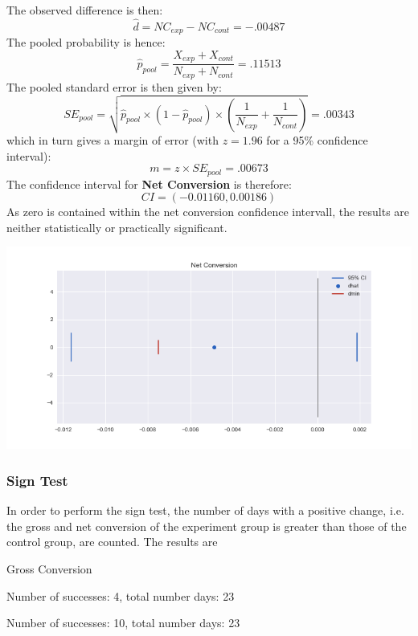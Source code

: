 \documentclass[11pt]{article} %
\begin{document}
The observed difference is then:
\begin{equation}
	\hat{d} = NC_{exp} - NC_{cont} = -.00487
\end{equation}
The pooled probability is hence:
\begin{equation}
	\hat{p}_{pool} = \frac{X_{exp}+ X_{cont}}{N_{exp} + N_{cont}} = .11513
\end{equation}
The pooled standard error is then given by:
\begin{equation}
	SE_{pool} = \sqrt{\hat{p}_{pool}\times \left(1-\hat{p}_{pool}\right) \times \left(\frac{1}{N_{exp}} + \frac{1}{N_{cont}}\right)} = .00343
\end{equation}
which in turn gives a margin of error (with $z=1.96$ for a 95\% confidence interval):
\begin{equation}
	m = z \times SE_{pool} = .00673
\end{equation}
The confidence interval for \textbf{Net Conversion} is therefore:
\begin{equation}
	CI = \left(-0.01160, 0.00186\right)
\end{equation}
As zero is contained within the net conversion confidence intervall, the results are neither statistically or practically significant.

\includegraphics[width=\textwidth]{net_conv}

\subsubsection{Sign Test}

In order to perform the sign test, the number of days with a positive change, i.e. the gross and net conversion of the experiment group is greater than those of the control group, are counted. The results are
\begin{labeling}{Gross Conversion}
\item[Gross Conversion] Number of successes: 4, total number days: 23
\item[Net Conversion] Number of successes: 10, total number days: 23
\end{labeling}
\end{document}
